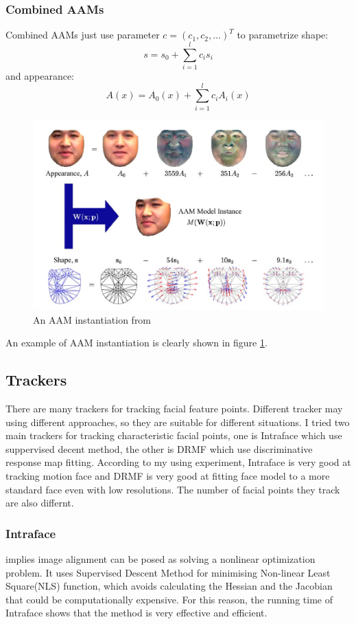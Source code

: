\subsubsection{Combined AAMs}
Combined AAMs just use parameter $c = (c_{1},c_{2}, ...)^{T}$ to parametrize shape:
\begin{equation}
s = s_{0} + \sum_{i=1}^{l}c_{i}s_{i}
\end{equation}
and appearance:
\begin{equation}
A(x) = A_{0}(x) + \sum_{i=1}^{l}c_{i}A_{i}(x)
\end{equation}
\begin{figure}[ht]
\centering
\includegraphics[width = \textwidth]{imgs/AAM_Model.png}
\caption{An AAM instantiation from \cite{matthews2004active}}
\label{fig:AAMI}
\end{figure}
An example of AAM instantiation is clearly shown in figure \ref{fig:AAMI}.
\subsection{Trackers}
There are many trackers for tracking facial feature points. Different tracker may using different approaches, so they are suitable for different situations. I tried two main trackers for tracking characteristic facial points, one is Intraface \cite{xiong2013supervised} which use suppervised decent method, the other is DRMF \cite{asthana2013robust} which use discriminative response map fitting. According to my using experiment, Intraface is very good at tracking motion face and DRMF is very good at fitting face model to a more standard face even with low resolutions. The number of facial points they track are also differnt.
\subsubsection{Intraface}
\cite{xiong2013supervised} implies image alignment  can be posed as solving a nonlinear optimization problem. It uses Supervised Descent Method for minimising Non-linear Least Square(NLS) function, which avoids calculating the Hessian and the Jacobian that could be computationally expensive. For this reason, the running time of Intraface shows that the method is very effective and efficient.
